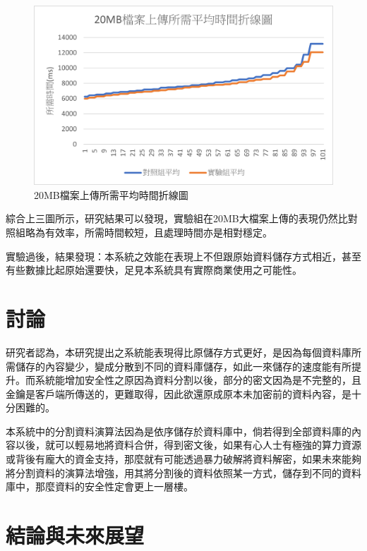 \documentclass[11pt,twocolumn]{article}
\begin{document}
\begin{figure}[h]
\centering
\includegraphics[scale=0.55]{20MB檔案上傳所需平均時間折線圖.png}
\caption{20MB檔案上傳所需平均時間折線圖}
\end{figure}\par
綜合上三圖所示，研究結果可以發現，實驗組在20MB大檔案上傳的表現仍然比對照組略為有效率，所需時間較短，且處理時間亦是相對穩定。\par
實驗過後，結果發現：本系統之效能在表現上不但跟原始資料儲存方式相近，甚至有些數據比起原始還要快，足見本系統具有實際商業使用之可能性。\par

\section{討論}
研究者認為，本研究提出之系統能表現得比原儲存方式更好，是因為每個資料庫所需儲存的內容變少，變成分散到不同的資料庫儲存，如此一來儲存的速度能有所提升。而系統能增加安全性之原因為資料分割以後，部分的密文因為是不完整的，且金鑰是客戶端所傳送的，更難取得，因此欲還原成原本未加密前的資料內容，是十分困難的。\par
本系統中的分割資料演算法因為是依序儲存於資料庫中，倘若得到全部資料庫的內容以後，就可以輕易地將資料合併，得到密文後，如果有心人士有極強的算力資源或背後有龐大的資金支持，那麼就有可能透過暴力破解將資料解密，如果未來能夠將分割資料的演算法增強，用其將分割後的資料依照某一方式，儲存到不同的資料庫中，那麼資料的安全性定會更上一層樓。\par

\section{結論與未來展望}
\end{document}
